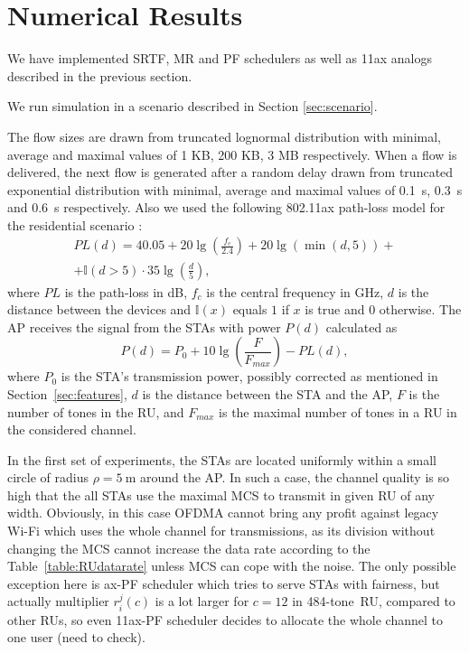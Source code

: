 \section{Numerical Results}
\label{sec:numerical}


We have implemented SRTF, MR and PF schedulers as well as 11ax analogs described in the previous section.

We run simulation in a scenario described in Section \ref{sec:scenario}.

The flow sizes are drawn from truncated lognormal distribution with minimal, average and maximal values of 1 KB, 200 KB, 3 MB respectively. 
When a flow is delivered, the next flow is generated after a random delay drawn from truncated exponential distribution with minimal, average and maximal values of \SI{0.1}{\s}, \SI{0.3}{\s} and \SI{0.6}{\s} respectively.
Also we used the following 802.11ax path-loss model for the residential scenario \cite{presentation_scenarios}:
\begin{multline*}
PL(d) = 40.05 + 20 \lg\left(\frac{f_c}{2.4}\right) + 20 \lg(\min(d, 5)) + \\
+ \mathbb{I}(d > 5) \cdot 35 \lg\left(\frac{d}{5}\right),
\end{multline*}
where $PL$ is the path-loss in dB, $f_c$ is the central frequency in GHz, $d$ is the distance between the devices and $\mathbb{I}{(x) }$ equals $1$ if $x$ is true and $0$ otherwise.
The AP receives the signal from the STAs with power $P(d)$ calculated as
$$
P(d) = P_0 + 10 \lg\left(\frac{F}{F_{max}}\right) - PL(d),
$$
where $P_0$ is the STA's transmission power, possibly corrected as mentioned in Section~\ref{sec:features}, $d$ is the distance between the STA and the AP, $F$ is the number of tones in the RU, and $F_{max}$ is the maximal number of tones in a RU in the considered channel.

In the first set of experiments, the STAs are located uniformly within a small circle of radius $\rho = \SI{5}{\m}$ around the AP.
In such a case, the channel quality is so high that the all STAs use the maximal MCS to transmit in given RU of any width.
Obviously, in this case OFDMA cannot bring any profit against legacy Wi-Fi which uses the whole channel for transmissions, as its division without changing the MCS cannot increase the data rate according to the Table~\ref{table:RUdatarate} unless MCS  can cope with the noise. The only possible exception here is ax-PF scheduler which tries to serve STAs with fairness, but actually multiplier $r^j_i (c)$ is a lot larger for $c=12$ in 484-tone~RU, compared to other RUs, so even 11ax-PF scheduler decides to allocate the whole channel to one user (need to check).


